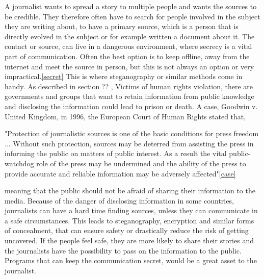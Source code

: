 A journalist wants to spread a story to multiple people and wants the sources to be credible. They therefore often have to search for people involved in the subject they are writing about, to have a primary source, which is a person that is directly evolved in the subject or for example written a document about it. The contact or source, can live in a dangerous environment, where secrecy is a vital part of communication. Often the best option is to keep offline, away from the internet and meet the source in person, but this is not always an option or very impractical.\ref{secret} This is where steganography or similar methods come in handy. As described in section ?? , Victims of human rights violation, there are governments and groups that want to retain information from public knowledge and disclosing the information could lead to prison or death. A case, Goodwin v. United Kingdom, in 1996, the European Court of Human Rights stated that, 

"Protection of journalistic sources is one of the basic conditions for press freedom ... Without such protection, sources may be deterred from assisting the press in informing the public on matters of public interest. As a result the vital public-watchdog role of the press may be undermined and the ability of the press to provide accurate and reliable information may be adversely affected"\ref{case}

meaning that the public should not be afraid of sharing their information to the media. Because of the danger of disclosing information in some countries, journalists can have a hard time finding sources, unless they can communicate in a safe circumstances. This leads to steganography, encryption and similar forms of concealment, that can ensure safety or drastically reduce the risk of getting uncovered. If the people feel safe, they are more likely to share their stories and the journalists have the possibility to pass on the information to the public. Programs that can keep the communication secret, would be a great asset to the journalist. 